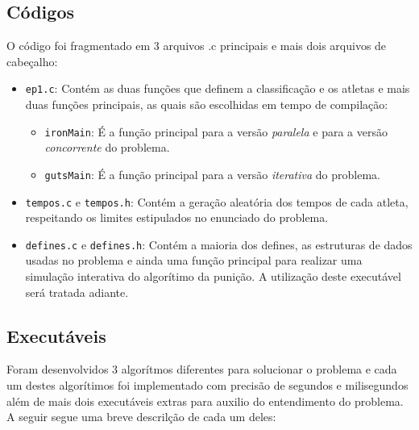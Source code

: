 \documentclass[12pt,a4paper]{article}
\begin{document}
\subsection{Códigos}
O código foi fragmentado em 3 arquivos .c principais e mais dois arquivos de cabeçalho:

\begin{itemize}
\item \verb+ep1.c+: Contém as duas funções que definem a classificação e os atletas e mais duas funções principais, as quais são escolhidas em tempo de compilação:
\begin{itemize}
\item \verb+ironMain+: É a função principal para a versão \textit{paralela} e para a versão \textit{concorrente} do problema.
\item \verb+gutsMain+: É a função principal para a versão \textit{iterativa} do problema.
\end{itemize}
\item \verb+tempos.c+ e \verb+tempos.h+: Contém a geração aleatória dos tempos de cada atleta, respeitando os limites estipulados no enunciado do problema.
\item \verb+defines.c+ e \verb+defines.h+:  Contém a maioria dos defines, as estruturas de dados usadas no problema e ainda uma função principal para realizar uma simulação interativa do algorítimo da punição. A utilização deste executável será tratada adiante.
\end{itemize}

\subsection{Executáveis}

Foram desenvolvidos 3 algorítmos diferentes para solucionar o problema e cada um destes algorítimos foi implementado com precisão de segundos e milisegundos além de mais dois executáveis extras para auxilio do entendimento do problema. A seguir segue uma breve descrilção de cada um deles: 
\end{document}

